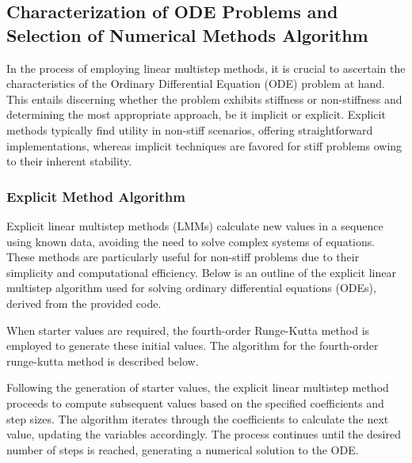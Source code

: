\subsection{Characterization of ODE Problems and Selection of Numerical Methods Algorithm}
In the process of employing linear multistep methods, it is crucial to ascertain the characteristics of the Ordinary Differential Equation (ODE) problem at hand. This entails discerning whether the problem exhibits stiffness or non-stiffness and determining the most appropriate approach, be it implicit or explicit. Explicit methods typically find utility in non-stiff scenarios, offering straightforward implementations, whereas implicit techniques are favored for stiff problems owing to their inherent stability.


\subsubsection{Explicit Method Algorithm}
Explicit linear multistep methods (LMMs) calculate new values in a sequence using known data, avoiding the need to solve complex systems of equations. These methods are particularly useful for non-stiff problems due to their simplicity and computational efficiency. Below is an outline of the explicit linear multistep algorithm used for solving ordinary differential equations (ODEs), derived from the provided code.

When starter values are required, the fourth-order Runge-Kutta method is employed to generate these initial values. The algorithm for the fourth-order runge-kutta method is described below.

Following the generation of starter values, the explicit linear multistep method proceeds to compute subsequent values based on the specified coefficients and step sizes. The algorithm iterates through the coefficients to calculate the next value, updating the variables accordingly. The process continues until the desired number of steps is reached, generating a numerical solution to the ODE.





